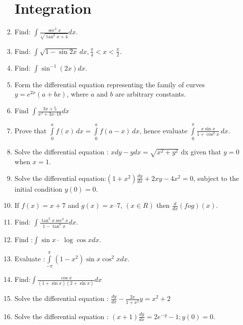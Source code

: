 \documentclass{article}
\begin{document}
\begin{enumerate}
\section{Integration}
\item  Find: $\int\frac{\sec^2x}{\sqrt{\tan^2x+4}}dx$.
\item Find: $\int \sqrt{1-\sin 2x} \, dx, \frac{\pi}{4} < x < \frac{\pi}{2}$.
\item Find: $\int{\sin^{-1}(2x)} dx$.
\item Form the differential equation representing the family of curves $y = e^{2x}(a + bx)$, where $a$ and $b$ are arbitrary constants.
\item  Find $\int \frac{3x + 5}{x^2+ 3x – 18}dx$
\item Prove that $\int\limits_{0}^{a} f(x) \,dx = \int\limits_{0}^{a} f(a-x) \,dx$, hence evaluate $\int\limits_{0}^{\pi} \frac{x\sin x}{1 + \cos^2 x} \, dx$.
\item Solve the differential equation : $x dy-y dx = \sqrt{x^2+y^2} $ dx given that $y=0$ when $x=1$.
\item Solve the differential equation:$(1+x^2)\frac{dy}{dx}+2xy-4x^2=0$, subject to the initial condition $y(0)=0$.
\item If $f(x) = x + 7$ and $g(x) = x – 7$, $(x\in R)$ then  $\frac{d}{dx}(fog)(x)$.
\item Find: $\int\frac{\tan^2x\sec^2x}{1-\tan^6x} dx$.
\item Find :$\int \sin x\cdot$ $\log\cos x dx$.
\item Evaluate :$\int\limits_{-\pi}^{\pi}(1-x^2)\sin x \cos^2xdx$.
\item Find:$\int\frac{\cos x}{(1 + \sin x)(2 + \sin x)} dx$
\item Solve the differential equation : $\frac{dy}{dx} - \frac{2x}{1+x^2}y = x^2 + 2$
\item Solve the differential equation : $(x+1)\frac{dy}{dx} =2e^{-y}-1;y(0)=0$.

\end{enumerate}
\end{document}
